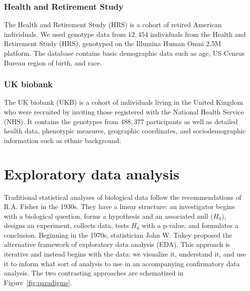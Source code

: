 \subsubsection{Health and Retirement Study}

The Health and Retirement Study (HRS) is a cohort of retired American individuals\citep{juster_overview_1995}. We used genotype data from $12,454$ individuals from the Health and Retirement Study (HRS), genotyped on the Illumina Human Omni 2.5M platform. The database contains basic demographic data such as age, US Census Bureau region of birth, and race.

\subsubsection{UK biobank}

The UK biobank (UKB) is a cohort of individuals living in the United Kingdom who were recruited by inviting those registered with the National Health Service (NHS)\citep{sudlow_uk_2015}. It contains the genotypes from $488,377$ participants as well as detailed health data, phenotypic measures, geographic coordinates, and sociodemographic information such as ethnic background.

\section{Exploratory data analysis}

Traditional statistical analyses of biological data follow the recommendations of R.A. Fisher in the 1930s\citep{holmes_modern_2019}. They have a linear structure: an investigator begins with a biological question, forms a hypothesis and an associated null ($H_0$), designs an experiment, collects data, tests $H_0$ with a p-value, and formulates a conclusion. Beginning in the 1970s, statistician John W. Tukey proposed the alternative framework of exploratory data analysis (EDA)\citep{tukey_1977,hoaglin_john_2003}. This approach is iterative and instead begins with the data: we visualize it, understand it, and use it to inform what sort of analysis to use in an accompanying confirmatory data analysis. The two contrasting approaches are schematized in Figure~\ref{fig:paradigms}.

